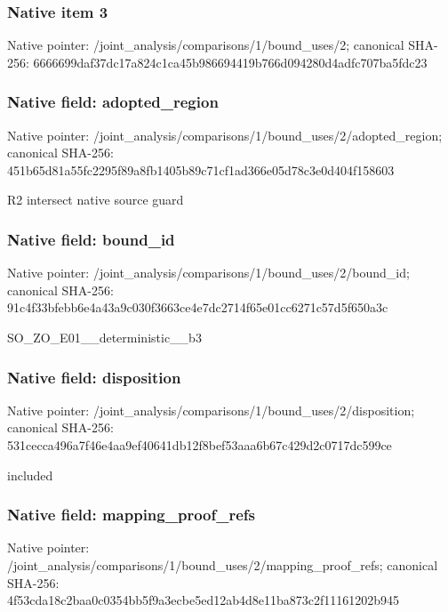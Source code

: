 \documentclass[10pt,a4paper]{article}
\begin{document}
\subsubsection{Native item 3}
Native pointer: /joint\_\allowbreak{}analysis/comparisons/1/bound\_\allowbreak{}uses/2; canonical SHA-256: 6666699daf37dc17a824c1ca45b986694419b766d094280d4adfc707ba5fdc23

\subsubsection{Native field: adopted\_\allowbreak{}region}
Native pointer: /joint\_\allowbreak{}analysis/comparisons/1/bound\_\allowbreak{}uses/2/adopted\_\allowbreak{}region; canonical SHA-256: 451b65d81a55fc2295f89a8fb1405b89c71cf1ad366e05d78c3e0d404f158603

\begingroup\raggedright\sloppy R2 intersect native source guard\par\endgroup

\subsubsection{Native field: bound\_\allowbreak{}id}
Native pointer: /joint\_\allowbreak{}analysis/comparisons/1/bound\_\allowbreak{}uses/2/bound\_\allowbreak{}id; canonical SHA-256: 91c4f33bfebb6e4a43a9c030f3663ce4e7dc2714f65e01cc6271c57d5f650a3c

\begingroup\raggedright\sloppy SO\_\allowbreak{}ZO\_\allowbreak{}E01\_\allowbreak{}\_\allowbreak{}deterministic\_\allowbreak{}\_\allowbreak{}b3\par\endgroup

\subsubsection{Native field: disposition}
Native pointer: /joint\_\allowbreak{}analysis/comparisons/1/bound\_\allowbreak{}uses/2/disposition; canonical SHA-256: 531cecca496a7f46e4aa9ef40641db12f8bef53aaa6b67c429d2c0717dc599ce

\begingroup\raggedright\sloppy included\par\endgroup

\subsubsection{Native field: mapping\_\allowbreak{}proof\_\allowbreak{}refs}
Native pointer: /joint\_\allowbreak{}analysis/comparisons/1/bound\_\allowbreak{}uses/2/mapping\_\allowbreak{}proof\_\allowbreak{}refs; canonical SHA-256: 4f53cda18c2baa0c0354bb5f9a3ecbe5ed12ab4d8e11ba873c2f11161202b945
\end{document}
